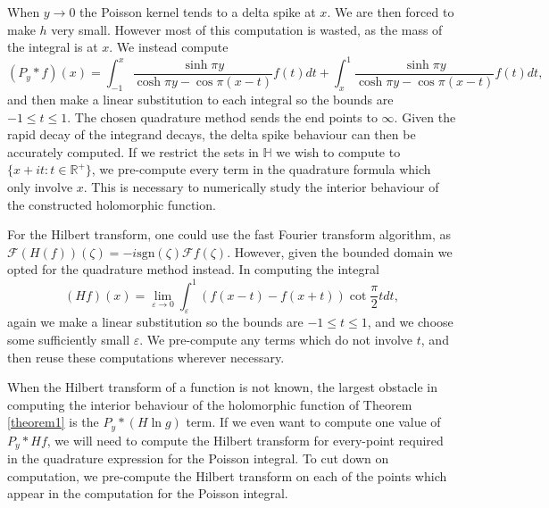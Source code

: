 \documentclass[a4paper, oneside, 12pt]{amsart}
\newcommand{\sgn}{\text{sgn}}
\newcommand{\eps}{\varepsilon}
\newcommand{\mc}{\mathcal}
\renewcommand{\H}{\mathbb{H}}
\newcommand{\R}{\mathbb{R}}
\newcommand{\fr}{\frac}
\begin{document}
When $y\to0$ 
the Poisson kernel tends to a delta spike at $x$. We are then forced to make $h$ very small. However most of this computation is wasted, as the mass of the integral
is at $x$. We instead compute
$$
         (P_y\ast f)(x) =  \int_{-1}^x\fr{\sinh\pi y}{\cosh\pi y - \cos\pi(x-t)} f(t) dt 
         + \int_{x}^1\fr{\sinh\pi y}{\cosh\pi y - \cos\pi(x-t)} f(t) dt,
$$
and then make a linear substitution to each integral so the bounds are $-1 \leq
t\leq 1$. The chosen quadrature method sends the end points to $\infty$. 
Given the rapid decay of the integrand decays, the delta spike behaviour can then
be accurately computed. If we restrict the sets in $\H$ we wish to
compute to $\{x + it:  t\in\R^+\}$, we pre-compute every term in the
quadrature formula which only involve $x$. This is necessary to numerically study the interior behaviour of the constructed holomorphic function.

For the Hilbert transform, one could use the fast Fourier transform algorithm,
as $\mc{F}(H(f))(\zeta) = -i\sgn(\zeta)\mc{F}f(\zeta)$. However, given the bounded domain we opted for the quadrature method instead. In computing the integral
$$
    (Hf)(x) = \lim_{\eps\to0} \int_{\eps}^1 (f(x-t) - f(x+t))\cot\fr{\pi}{2} t dt,
$$
again we make a linear substitution so the bounds are $-1\leq t\leq 1$, and
we choose some sufficiently small $\eps$. We pre-compute any terms which do not
involve $t$, and then reuse these computations
wherever necessary.

When the Hilbert transform of a function is not known, the largest obstacle in
computing the interior behaviour of the holomorphic function of Theorem
\ref{theorem1} is the $P_y\ast(H\ln g)$ term. If we even want to compute one
value of $P_y \ast H f$, we will need to compute the Hilbert transform for
every-point required in the quadrature expression for the Poisson integral. To
cut down on computation, we pre-compute the Hilbert transform on each of the points 
which appear in the computation for the Poisson integral.



\end{document}
